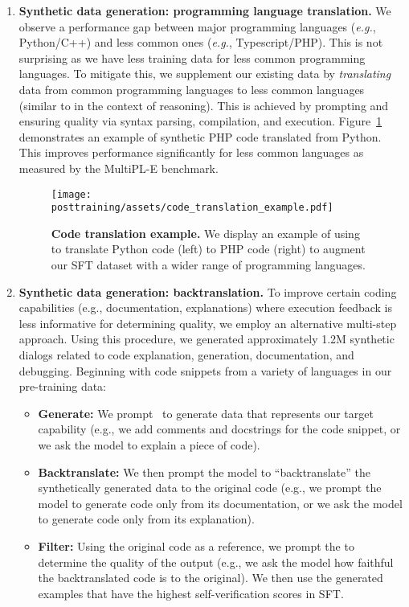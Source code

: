 \begin{enumerate}
    \item{\textbf{Synthetic data generation: programming language translation.}} We observe a performance gap between major programming languages (\emph{e.g.}, Python/C++) and less common ones (\emph{e.g.}, Typescript/PHP). This is not surprising as we have less training data for less common programming languages. To mitigate this, we supplement our existing data by \emph{translating} data from common programming languages to less common languages (similar to \cite{chen2023breakinglanguagebarriersmultilingual} in the context of reasoning). This is achieved by prompting \llamathree and ensuring quality via syntax parsing, compilation, and execution. Figure~\ref{fig:code_translation_example} demonstrates an example of synthetic PHP code translated from Python. This improves performance significantly for less common languages as measured by the MultiPL-E \citep{cassano2022multiple} benchmark. 
    
    \begin{figure}
    \centering
    \texttt{[image: posttraining/assets/code\_translation\_example.pdf]}
    \caption{\label{fig:code_translation_example} \textbf{Code translation example.} We display an example of using \llamathree to translate Python code (left) to PHP code (right) to augment our SFT dataset with a wider range of programming languages.}
    \end{figure}


    \item{\textbf{Synthetic data generation: backtranslation.}} To improve certain coding capabilities (e.g., documentation, explanations) where execution feedback is less informative for determining quality, we employ an alternative multi-step approach. Using this procedure, we generated approximately 1.2M synthetic dialogs related to code explanation, generation, documentation, and debugging. Beginning with code snippets from a variety of languages in our pre-training data:
    \begin{itemize}
        \item \textbf{Generate:} We prompt \llamathree~to generate data that represents our target capability (e.g., we add comments and docstrings for the code snippet, or we ask the model to explain a piece of code).
        \item \textbf{Backtranslate:} We then prompt the model to ``backtranslate'' the synthetically generated data to the original code (e.g., we prompt the model to generate code only from its documentation, or we ask the model to generate code only from its explanation).
        \item \textbf{Filter:} Using the original code as a reference, we prompt the \llamathree to determine the quality of the output (e.g., we ask the model how faithful the backtranslated code is to the original). We then use the generated examples that have the highest self-verification scores in SFT. 
    \end{itemize}

\end{enumerate}


